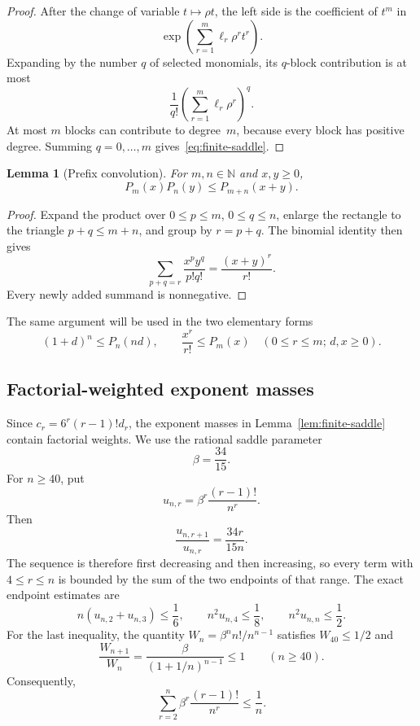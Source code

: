 \documentclass[11pt]{article}
\newtheorem{lemma}[theorem]{Lemma}
\theoremstyle{definition}
\theoremstyle{remark}
\begin{document}
\begin{proof}
After the change of variable $t\mapsto\rho t$, the left side is the
coefficient of $t^m$ in
\[
 \exp\left(\sum_{r=1}^m\ell_r\rho^rt^r\right).
\]
Expanding by the number $q$ of selected monomials, its $q$-block contribution
is at most
\[
 \frac{1}{q!}\left(\sum_{r=1}^m\ell_r\rho^r\right)^q.
\]
At most $m$ blocks can contribute to degree~$m$, because every block has
positive degree.  Summing
$q=0,\ldots,m$ gives~\eqref{eq:finite-saddle}.
\end{proof}

\begin{lemma}[Prefix convolution]\label{lem:prefix-conv}
For $m,n\in\mathbb N$ and $x,y\ge0$,
\begin{equation}\label{eq:prefix-conv}
  P_m(x)P_n(y)\le P_{m+n}(x+y).
\end{equation}
\end{lemma}

\begin{proof}
Expand the product over $0\le p\le m$, $0\le q\le n$, enlarge the rectangle
to the triangle $p+q\le m+n$, and group by $r=p+q$.  The binomial identity
then gives
\[
 \sum_{p+q=r}\frac{x^py^q}{p!q!}=\frac{(x+y)^r}{r!}.
\]
Every newly added summand is nonnegative.
\end{proof}

The same argument will be used in the two elementary forms
\begin{equation}\label{eq:prefix-absorptions}
  (1+d)^n\le P_n(nd),
  \qquad
  \frac{x^r}{r!}\le P_m(x)
  \quad(0\le r\le m;\,d,x\ge0).
\end{equation}

\subsection{Factorial-weighted exponent masses}

Since $c_r=6^r(r-1)!d_r$, the exponent masses in
Lemma~\ref{lem:finite-saddle} contain factorial weights.  We use the rational
saddle parameter
\begin{equation}\label{eq:beta}
  \beta=\frac{34}{15}.
\end{equation}
For $n\ge40$, put
\[
  u_{n,r}=\beta^r\frac{(r-1)!}{n^r}.
\]
Then
\begin{equation}\label{eq:u-ratio}
  \frac{u_{n,r+1}}{u_{n,r}}=\frac{34r}{15n}.
\end{equation}
The sequence is therefore first decreasing and then increasing, so every term
with $4\le r\le n$ is bounded by the sum of the two endpoints of that range.
The exact endpoint estimates are
\begin{equation}\label{eq:gas-components}
 n(u_{n,2}+u_{n,3})\le\frac16,
 \qquad n^2u_{n,4}\le\frac18,
 \qquad n^2u_{n,n}\le\frac12.
\end{equation}
For the last inequality, the quantity
$W_n=\beta^n n!/n^{n-1}$ satisfies $W_{40}\le1/2$ and
\[
  \frac{W_{n+1}}{W_n}
  =\frac{\beta}{(1+1/n)^{n-1}}\le1
  \qquad(n\ge40).
\]
Consequently,
\begin{equation}\label{eq:tempered-gas}
  \sum_{r=2}^n\beta^r\frac{(r-1)!}{n^r}\le\frac1n.
\end{equation}
\end{document}

